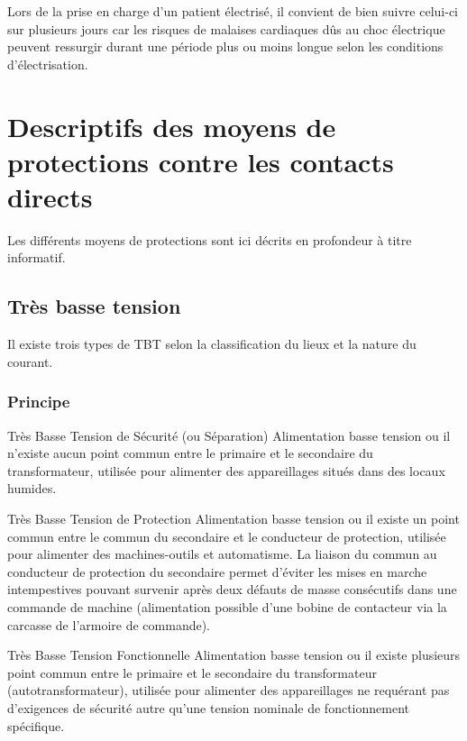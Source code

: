Lors de la prise en charge d'un patient électrisé, il convient de bien suivre celui-ci sur plusieurs jours car les risques de malaises cardiaques dûs au choc électrique peuvent ressurgir durant une période plus ou moins longue selon les conditions d'électrisation.

\section{Descriptifs des moyens de protections contre les contacts directs}

Les différents moyens de protections sont ici décrits en profondeur à titre informatif.

\subsection{Très basse tension\label{subsec:TBT}}

Il existe trois types de TBT selon la classification du lieux et la nature du courant.

\subsubsection{Principe}

\begin{definition}{Très Basse Tension de Sécurité (ou Séparation)}{}
 Alimentation basse tension ou il n'existe aucun point commun entre le primaire et le secondaire du transformateur, utilisée pour alimenter des appareillages situés dans des locaux humides.
\end{definition}

\begin{definition}{Très Basse Tension de Protection}{}
Alimentation basse tension ou il existe un point commun entre le commun du secondaire et le conducteur de protection, utilisée pour alimenter des machines-outils et automatisme. La liaison du commun au conducteur de protection du secondaire permet d'éviter les mises en marche intempestives pouvant survenir après deux défauts de masse consécutifs dans une commande de machine (alimentation possible d'une bobine de contacteur via la carcasse de l'armoire de commande).
\end{definition}

\begin{definition}{Très Basse Tension Fonctionnelle}{}
Alimentation basse tension ou il existe plusieurs point commun entre le primaire et le secondaire du transformateur (autotransformateur), utilisée pour alimenter des appareillages ne requérant pas d'exigences de sécurité autre qu'une tension nominale de fonctionnement spécifique.
\end{definition}


